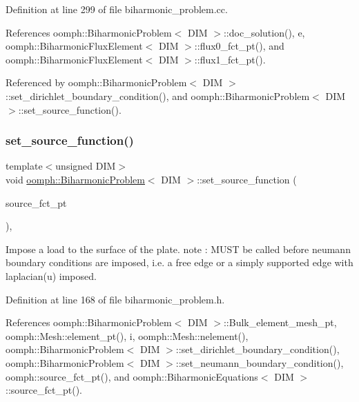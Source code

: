 Definition at line 299 of file biharmonic\+\_\+problem.\+cc.



References oomph\+::\+Biharmonic\+Problem$<$ D\+I\+M $>$\+::doc\+\_\+solution(), e, oomph\+::\+Biharmonic\+Flux\+Element$<$ D\+I\+M $>$\+::flux0\+\_\+fct\+\_\+pt(), and oomph\+::\+Biharmonic\+Flux\+Element$<$ D\+I\+M $>$\+::flux1\+\_\+fct\+\_\+pt().



Referenced by oomph\+::\+Biharmonic\+Problem$<$ D\+I\+M $>$\+::set\+\_\+dirichlet\+\_\+boundary\+\_\+condition(), and oomph\+::\+Biharmonic\+Problem$<$ D\+I\+M $>$\+::set\+\_\+source\+\_\+function().

\mbox{\label{classoomph_1_1BiharmonicProblem_aed3e4068c71df9c27f561b5880b49e18}} 
\subsubsection{\texorpdfstring{set\+\_\+source\+\_\+function()}{set\_source\_function()}}
{\footnotesize\ttfamily template$<$unsigned D\+IM$>$ \\
void \hyperlink{classoomph_1_1BiharmonicProblem}{oomph\+::\+Biharmonic\+Problem}$<$ D\+IM $>$\+::set\+\_\+source\+\_\+function (\begin{DoxyParamCaption}\item[{const \hyperlink{classoomph_1_1BiharmonicProblem_a08d7386bbae19862d6fa656b8a2ae2a0}{Biharmonic\+Source\+Fct\+Pt}}]{source\+\_\+fct\+\_\+pt }\end{DoxyParamCaption})\hspace{0.3cm}{\ttfamily [inline]}, {\ttfamily [protected]}}



Impose a load to the surface of the plate. note \+: M\+U\+ST be called before neumann boundary conditions are imposed, i.\+e. a free edge or a simply supported edge with laplacian(u) imposed. 



Definition at line 168 of file biharmonic\+\_\+problem.\+h.



References oomph\+::\+Biharmonic\+Problem$<$ D\+I\+M $>$\+::\+Bulk\+\_\+element\+\_\+mesh\+\_\+pt, oomph\+::\+Mesh\+::element\+\_\+pt(), i, oomph\+::\+Mesh\+::nelement(), oomph\+::\+Biharmonic\+Problem$<$ D\+I\+M $>$\+::set\+\_\+dirichlet\+\_\+boundary\+\_\+condition(), oomph\+::\+Biharmonic\+Problem$<$ D\+I\+M $>$\+::set\+\_\+neumann\+\_\+boundary\+\_\+condition(), oomph\+::source\+\_\+fct\+\_\+pt(), and oomph\+::\+Biharmonic\+Equations$<$ D\+I\+M $>$\+::source\+\_\+fct\+\_\+pt().



